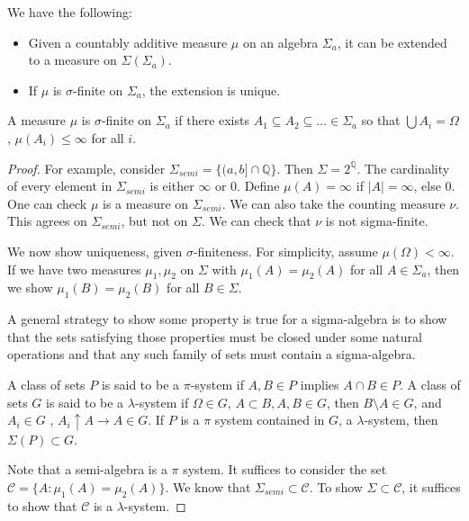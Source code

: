 \documentclass[11pt]{scrartcl}
\newcommand{\Q}{\mathbb{Q}}
\begin{document}
\begin{thm} We have the following:
\begin{itemize}
\item Given a countably additive measure $\mu$ on an algebra $\Sigma_a$, it can be extended to a measure on $\Sigma(\Sigma_a)$.
\item If $\mu$ is $\sigma$-finite on $\Sigma_a$, the extension is unique.
\end{itemize}
A measure $\mu$ is $\sigma$-finite on $\Sigma_a$ if there exists $A_1 \subseteq A_2 \subseteq \dots \in \Sigma_a$ so that $\bigcup A_i = \Omega$, $\mu(A_i) \le \infty$ for all $i$.
\end{thm}
\begin{proof}
For example, consider $\Sigma_{semi} = \{(a, b] \cap \Q\}$.  Then $\Sigma = 2^\Q$.  The cardinality of every element in $\Sigma_{semi}$ is either $\infty$ or $0$.  Define $\mu(A) = \infty$ if $|A| = \infty$, else $0$.  One can check $\mu$ is a measure on $\Sigma_{semi}$.  We can also take the counting measure $\nu$.  This agrees on $\Sigma_{semi}$, but not on $\Sigma$.  We can check that $\nu$ is not sigma-finite.

We now show uniqueness, given $\sigma$-finiteness.  For simplicity, assume $\mu(\Omega) < \infty$.   If we have two measures $\mu_1, \mu_2$ on $\Sigma$ with $\mu_1(A) = \mu_2(A)$ for all $A \in \Sigma_a$, then we show $\mu_1(B) = \mu_2(B)$ for all $B\in \Sigma$.

A general strategy to show some property is true for a sigma-algebra is to show that the sets satisfying those properties must be closed under some natural operations and that any such family of sets must contain a sigma-algebra.
\begin{thm}[$\pi$ - $\lambda$] A class of sets $P$ is said to be a $\pi$-system if $A, B \in P$ implies $A \cap B \in P$.  A class of sets $G$ is said to be a $\lambda$-system if $\Omega \in G$, $A \subset B, A, B \in G$, then $B \setminus A \in G$, and $A_i \in G$ , $A_i \uparrow A \rightarrow A \in G$.  If $P$ is a $\pi$ system contained in $G$, a $\lambda$-system, then $\Sigma(P) \subset G$.
\end{thm}

Note that a semi-algebra is a $\pi$ system.  It suffices to consider the set $\mathscr{C} = \{A : \mu_1(A) = \mu_2(A)\}.$  We know that $\Sigma_{semi} \subset \mathscr{C}$.  To show $\Sigma \subset \mathscr{C}$, it suffices to show that $\mathscr{C}$ is a $\lambda$-system.  


\end{proof}
\end{document}
